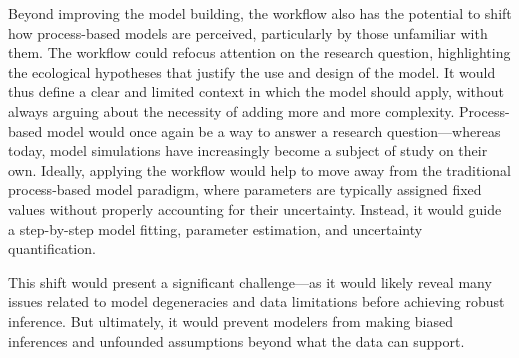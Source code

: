 \documentclass[11pt]{article}
\begin{document}
Beyond improving the model building, the workflow also has the potential to shift how process-based models are perceived, particularly by those unfamiliar with them. The workflow could refocus attention on the research question, highlighting the ecological hypotheses that justify the use and design of the model. It would thus define a clear and limited context in which the model should apply, without always arguing about the necessity of adding more and more complexity.  %
Process-based model would once again be a way to answer a research question---whereas today, model simulations have increasingly become a subject of study on their own.
Ideally, applying the workflow would help to move away from the traditional process-based model paradigm, where parameters are typically assigned fixed values without properly accounting for their uncertainty. Instead, it would guide a step-by-step model fitting, parameter estimation, and uncertainty quantification. 

This shift would present a significant challenge---as it would likely reveal many issues related to model degeneracies and data limitations before achieving robust inference. But ultimately, it would prevent modelers from making biased inferences and unfounded assumptions beyond what the data can support. 
\end{document}

